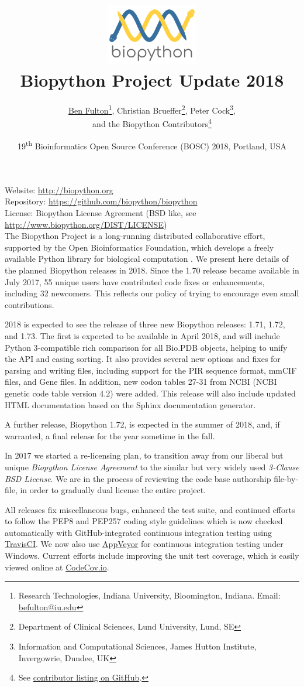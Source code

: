 \documentclass[10pt,oneside]{article}
\title{%
\vspace{-1.5in}
\includegraphics[width=0.3\textwidth]{biopython_logo_s.png} \\
\vspace{3mm}Biopython Project Update 2018}
\author{
	\underline{Ben Fulton}\thanks{Research Technologies, Indiana University, Bloomington, Indiana. Email: \href{mailto:befulton@iu.edu}{befulton@iu.edu}},
    Christian Brueffer\thanks{Department of Clinical Sciences, Lund University, Lund, SE},
    Peter Cock\thanks{Information and Computational Sciences, James Hutton Institute, Invergowrie, Dundee, UK},\\
    and the Biopython Contributors\thanks{See \href{https://github.com/biopython/biopython/blob/master/CONTRIB.rst}{contributor listing on GitHub}.}}
\date{19\textsuperscript{th} Bioinformatics Open Source Conference (BOSC) 2018, Portland, USA}
\begin{document}
\maketitle
\thispagestyle{empty}

\vspace{-0.2in}
\noindent
Website: \url{http://biopython.org} \\
Repository: \url{https://github.com/biopython/biopython} \\
License: Biopython License Agreement (BSD like, see \url{http://www.biopython.org/DIST/LICENSE}) \\

The Biopython Project is a long-running distributed collaborative effort,
supported by the Open Bioinformatics Foundation, which develops a freely
available Python library for biological computation \cite{AppNote}.
We present here details of the planned Biopython releases in 2018. 
Since the 1.70 release 
became available in July 2017, 55 unique users have contributed code 
fixes or enhancements, including 32 newcomers. This reflects our policy of
trying to encourage even small contributions.

2018 is expected to see the release of three new Biopython releases: 1.71, 1.72,
and 1.73. The first is expected to be available in April 2018, and will include
Python 3-compatible rich
comparison for all Bio.PDB objects, helping to unify the API and easing sorting.
It also provides several new options and fixes for parsing and writing files, 
including support for the PIR sequence format, mmCIF files, and Gene files. In addition,
new codon tables 27-31 from NCBI (NCBI genetic code table version 4.2) were added.
This release will also include updated HTML
documentation based on the Sphinx documentation generator.

A further release, Biopython 1.72, is expected in the summer of 2018, and, if
warranted, a final release for the year sometime in the fall.

In 2017 we started a re-licensing plan, to transition away
from our liberal but unique \emph{Biopython License Agreement} to the similar
but very widely used \emph{3-Clause BSD License}. We are in the process of 
reviewing the code base authorship file-by-file, in order to gradually dual 
license the entire project.

All releases fix miscellaneous bugs, enhanced the test suite,
and continued efforts to follow the PEP8 and PEP257 coding style guidelines
which is now checked automatically with GitHub-integrated continuous integration
testing using \href{https://travis-ci.org/biopython/biopython/builds}{TravisCI}.
We now also use \href{https://ci.appveyor.com/project/biopython/biopython/history}{AppVeyor}
for continuous integration testing under Windows.
Current efforts include improving the unit test coverage, which is easily viewed
online at \href{https://codecov.io/github/biopython/biopython/}{CodeCov.io}.
\end{document}
